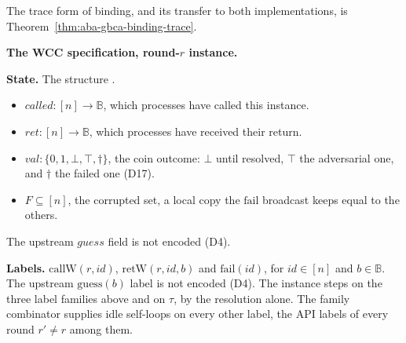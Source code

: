 

The trace form of binding, and its transfer to both implementations, is Theorem~\ref{thm:aba-gbca-binding-trace}.






\noindent\textbf{The WCC specification, round-$r$ instance.}

\medskip
\noindent\textbf{State.} The structure .
\begin{itemize}
  \item $called : [n] \to \mathbb{B}$, which processes have called this instance.
  \item $ret : [n] \to \mathbb{B}$, which processes have received their return.
  \item $val : \{0,1,\bot,\top,\dagger\}$, the coin outcome: $\bot$ until resolved, $\top$ the adversarial one, and $\dagger$ the failed one (D17).
  \item $F \subseteq [n]$, the corrupted set, a local copy the $\mathrm{fail}$ broadcast keeps equal to the others.
\end{itemize}
\noindent The upstream $guess$ field is not encoded (D4).

\noindent\textbf{Labels.}
$\mathrm{callW}(r,id)$, $\mathrm{retW}(r,id,b)$ and $\mathrm{fail}(id)$, for $id \in [n]$ and $b \in \mathbb{B}$.
The upstream $\mathrm{guess}(b)$ label is not encoded (D4).
The instance steps on the three label families above and on $\tau$, by the resolution alone.
The family combinator supplies idle self-loops on every other label, the API labels of every round $r' \neq r$ among them.

